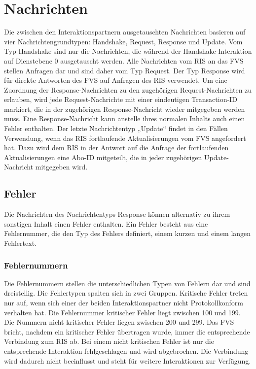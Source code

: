 \chapter{Nachrichten}
\label{sec:Nachrichten}
Die zwischen den Interaktionspartnern ausgetauschten Nachrichten basieren auf vier Nachrichtengrundtypen: Handshake, Request, Response und Update. Vom Typ Handshake sind nur die Nachrichten, die während der Handshake-Interaktion auf Dienstebene 0 ausgetauscht werden. Alle Nachrichten vom RIS an das FVS stellen Anfragen dar und sind daher vom Typ Request. Der Typ Response wird für direkte Antworten des FVS auf Anfragen des RIS verwendet. Um eine Zuordnung der Response-Nachrichten zu den zugehörigen Request-Nachrichten zu erlauben, wird jede Request-Nachrichte mit einer eindeutigen Transaction-ID markiert, die in der zugehörigen Response-Nachricht wieder mitgegeben werden muss. Eine Response-Nachricht kann anstelle ihres normalen Inhalts auch einen Fehler enthalten. Der letzte Nachrichtentyp „Update“ findet in den Fällen Verwendung, wenn das RIS fortlaufende Aktualisierungen vom FVS angefordert hat. Dazu wird dem RIS in der Antwort auf die Anfrage der fortlaufenden Aktualisierungen eine Abo-ID mitgeteilt, die in jeder zugehörigen Update-Nachricht mitgegeben wird.



\section{Fehler}
Die Nachrichten des Nachrichtentyps Response können alternativ zu ihrem sonstigen Inhalt einen Fehler enthalten. Ein Fehler besteht aus eine Fehlernummer, die den Typ des Fehlers definiert, einem kurzen und einem langen Fehlertext.



\subsection{Fehlernummern}
Die Fehlernummern stellen die unterschiedlichen Typen von Fehlern dar und sind dreistellig. Die Fehlertypen spalten sich in zwei Gruppen. Kritische Fehler treten nur auf, wenn sich einer der beiden Interaktionspartner nicht Protokollkonform verhalten hat. Die Fehlernummer kritischer Fehler liegt zwischen 100 und 199. Die Nummern nicht kritischer Fehler liegen zwischen 200 und 299. Das FVS bricht, nachdem ein kritischer Fehler übertragen wurde, immer die entsprechende Verbindung zum RIS ab. Bei einem nicht kritischen Fehler ist nur die entsprechende Interaktion fehlgeschlagen und wird abgebrochen. Die Verbindung wird dadurch nicht beeinflusst und steht für weitere Interaktionen zur Verfügung.

